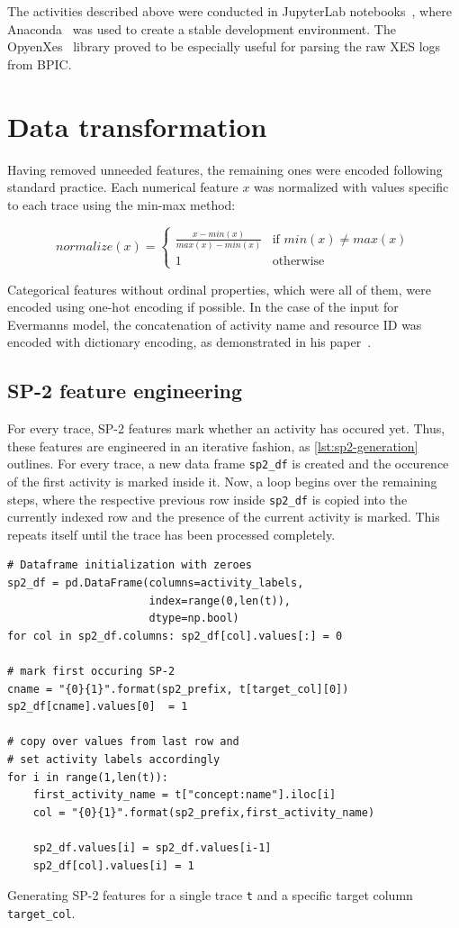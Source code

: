 The activities described above were conducted in JupyterLab notebooks~\cite{web:jupyter}, where Anaconda~\cite{web:anaconda} was used to create a stable development environment. The OpyenXes~\cite{web:opyenxes} library proved to be especially useful for parsing the raw XES logs from BPIC.

\section{Data transformation}
\label{sec:eval:data-transformation}
Having removed unneeded features, the remaining ones were encoded following standard practice. Each numerical feature $x$ was normalized with values specific to each trace using the min-max method:

$$normalize(x) =
\begin{cases}
\frac{x-min(x)}{max(x)-min(x)} & \text{if } min(x) \neq max(x)\\
1 & \text{otherwise}
\end{cases}
$$

Categorical features without ordinal properties, which were all of them, were encoded using one-hot encoding if possible. In the case of the input for Evermanns model, the concatenation of activity name and resource ID was encoded with dictionary encoding, as demonstrated in his paper~\cite{evermann2016}.

\subsection*{SP-2 feature engineering}
For every trace, SP-2 features mark whether an activity has occured yet. Thus, these features are engineered in an iterative fashion, as \autoref{lst:sp2-generation} outlines. For every trace, a new data frame \texttt{sp2\_df} is created and the occurence of the first activity is marked inside it. Now, a loop begins over the remaining steps, where the respective previous row inside \texttt{sp2\_df} is copied into the currently indexed row and the presence of the current activity is marked. This repeats itself until the trace has been processed completely.

\begin{listing}[ht]
\begin{verbatim}
# Dataframe initialization with zeroes
sp2_df = pd.DataFrame(columns=activity_labels,
                      index=range(0,len(t)),
                      dtype=np.bool)
for col in sp2_df.columns: sp2_df[col].values[:] = 0

# mark first occuring SP-2 
cname = "{0}{1}".format(sp2_prefix, t[target_col][0])
sp2_df[cname].values[0]  = 1

# copy over values from last row and
# set activity labels accordingly
for i in range(1,len(t)):
    first_activity_name = t["concept:name"].iloc[i]
    col = "{0}{1}".format(sp2_prefix,first_activity_name)
    
    sp2_df.values[i] = sp2_df.values[i-1]
    sp2_df[col].values[i] = 1
\end{verbatim}
\caption{Generating SP-2 features for a single trace \texttt{t} and a specific target column \texttt{target\_col}.}
\label{lst:sp2-generation}
\end{listing}

